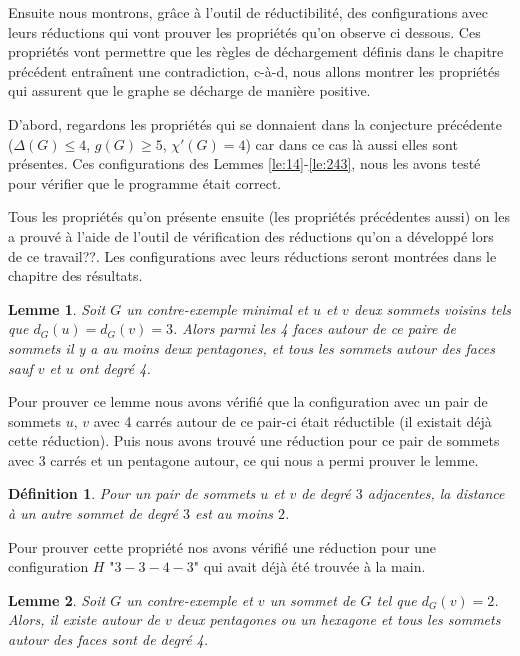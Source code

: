 \documentclass[10pt,a4paper]{article}
\newtheorem{definition}{Définition}
\newtheorem{lemme}{Lemme}
\begin{document}
Ensuite nous montrons, grâce à l'outil de réductibilité, des configurations avec leurs réductions qui vont prouver les propriétés qu'on observe ci dessous. Ces propriétés vont permettre que les règles de déchargement définis dans le chapitre précédent entraînent une contradiction, c-à-d, nous allons montrer les propriétés qui assurent que le graphe se décharge de manière positive.

D'abord, regardons les propriétés qui se donnaient dans la conjecture précédente ($\Delta(G) \leq 4$, $g(G) \geq 5$, $\chi'(G) =4$) car dans ce cas là aussi elles sont présentes. Ces configurations des Lemmes \ref{le:14}-\ref{le:243}, nous les avons testé pour vérifier que le programme était correct. 

Tous les propriétés qu'on présente ensuite (les propriétés précédentes aussi) on les a prouvé à l'aide de l'outil de vérification des réductions qu'on a développé lors de ce {\color{blue}travail??}. Les configurations avec leurs réductions seront montrées dans le chapitre des résultats.

\begin{lemme}
Soit $G$ un contre-exemple minimal et $u$ et $v$ deux sommets voisins tels que $d_G(u)=d_G(v) = 3$. Alors parmi les 4 faces autour de ce paire de sommets il y a au moins deux pentagones, et tous les sommets autour des faces sauf $v$ et $u$ ont degré 4.
\label{le:33pent}
\end{lemme}

Pour prouver ce lemme nous avons vérifié que la configuration avec un pair de sommets $u$, $v$ avec 4 carrés autour de ce pair-ci était réductible (il existait déjà cette réduction). Puis nous avons trouvé une réduction pour ce pair de sommets avec 3 carrés et un pentagone autour, ce qui nous a permi prouver le lemme.

\begin{definition}
Pour un pair de sommets $u$ et $v$ de degré $3$ adjacentes, la distance à un autre sommet de degré $3$ est au moins $2$.
\label{de:3343}
\end{definition}

Pour prouver cette propriété nos avons vérifié une réduction pour une configuration $H$ "$3-3-4-3$" qui avait déjà été trouvée à la main. 


\begin{lemme}
Soit $G$ un contre-exemple et $v$ un sommet de $G$ tel que $d_G(v) = 2$. Alors, il existe autour de $v$ deux pentagones ou un hexagone et tous les sommets autour des faces sont de degré 4.
\label{le:2pent}
\end{lemme}
\end{document}
